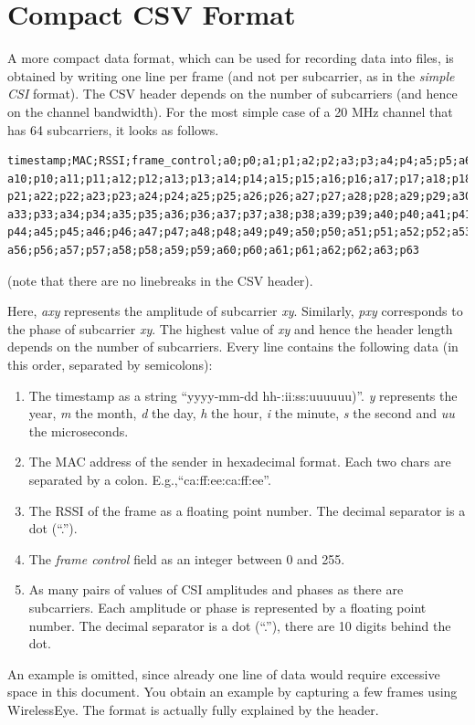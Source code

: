 \documentclass{article}
\begin{document}
\section{Compact CSV Format}
A more compact data format, which can be used for recording data into files, is obtained by writing one line per frame (and not per subcarrier, as in the \textit{simple CSI} format).
The CSV header depends on the number of subcarriers (and hence on the channel bandwidth). For the most simple case of a 20 MHz channel that has 64 subcarriers, it looks as follows.
\begin{Verbatim}[fontsize=\small]
timestamp;MAC;RSSI;frame_control;a0;p0;a1;p1;a2;p2;a3;p3;a4;p4;a5;p5;a6;p6;a7;p7;a8;p8;a9;p9;
a10;p10;a11;p11;a12;p12;a13;p13;a14;p14;a15;p15;a16;p16;a17;p17;a18;p18;a19;p19;a20;p20;a21;
p21;a22;p22;a23;p23;a24;p24;a25;p25;a26;p26;a27;p27;a28;p28;a29;p29;a30;p30;a31;p31;a32;p32;
a33;p33;a34;p34;a35;p35;a36;p36;a37;p37;a38;p38;a39;p39;a40;p40;a41;p41;a42;p42;a43;p43;a44;
p44;a45;p45;a46;p46;a47;p47;a48;p48;a49;p49;a50;p50;a51;p51;a52;p52;a53;p53;a54;p54;a55;p55;
a56;p56;a57;p57;a58;p58;a59;p59;a60;p60;a61;p61;a62;p62;a63;p63
\end{Verbatim}
(note that there are no linebreaks in the CSV header).

Here, \textit{axy} represents the amplitude of subcarrier \textit{xy}. Similarly, \textit{pxy} corresponds to the phase of subcarrier \textit{xy}. The highest value of \textit{xy} and hence the header length depends on the 
number of subcarriers.
Every line contains the following data (in this order, separated by semicolons):
\begin{enumerate}
	\item The timestamp as a string ``yyyy-mm-dd hh-:ii:ss:uuuuuu)''. \textit{y} represents the year, \textit{m} the month, \textit{d} the day, \textit{h} the hour, \textit{i} the minute, \textit{s} the second and \textit{uu} the microseconds.
	\item The MAC address of the sender in hexadecimal format. Each two chars are separated by a colon. E.g.,``ca:ff:ee:ca:ff:ee''.
	\item The RSSI of the frame as a floating point number. The decimal separator is a dot (``.'').
	\item The \textit{frame control} field as an integer between 0 and 255.
	\item As many pairs of values of CSI amplitudes and phases as there are subcarriers.  Each amplitude or phase is represented by a floating point number. The decimal separator is a dot (``.''), there are 10 digits behind the dot.
\end{enumerate}
An example is omitted, since already one line of data would require excessive space in this document. You obtain an example by capturing a few frames using WirelessEye. The format is actually fully explained by the header.
\end{document}
